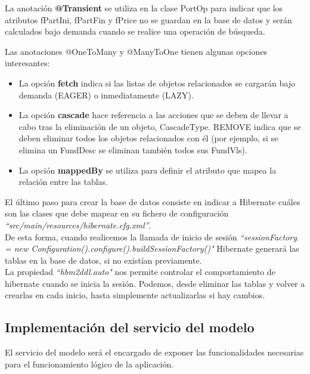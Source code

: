 \documentclass[12pt, a4paper]{book}
\begin{document}
La anotación \textbf{@Transient} se utiliza en la clase PortOp para indicar que los atributos fPartIni, fPartFin y fPrice no se guardan en la base de datos y serán calculados bajo demanda cuando se realice una operación de búsqueda.

\newpage
Las anotaciones @OneToMany y @ManyToOne tienen algunas opciones interesantes:
\begin{itemize}
	\item La opción \textbf{fetch} indica si las listas de objetos relacionados se cargarán bajo demanda (EAGER) o inmediatamente (LAZY).
	\item La opción \textbf{cascade} hace referencia a las acciones que se deben de llevar a cabo tras la eliminación de un objeto, CascadeType. REMOVE indica que se deben eliminar todos los objetos relacionados con él (por ejemplo, si se elimina un FundDesc se eliminan también todos sus FundVls).
	\item La opción \textbf{mappedBy} se utiliza para definir el atributo que mapea la relación entre las tablas.\\
\end{itemize}

 El último paso para crear la base de datos consiste en indicar a Hibernate cuáles son las clases que debe mapear en su fichero de configuración \textit{``src/main/resources/hibernate.cfg.xml''}.\\
 
  De esta forma, cuando realicemos la llamada de inicio de sesión \textit{``sessionFactory = new Configuration().configure().buildSessionFactory()"} Hibernate generará las tablas en la base de datos, si no existían previamente.\\
 
  La propiedad \textit{``hbm2ddl.auto"} nos permite controlar el comportamiento de hibernate cuando se inicia la sesión. Podemos, desde eliminar las tablas y volver a crearlas en cada inicio, hasta simplemente actualizarlas si hay cambios.

\newpage

\subsection{Implementación del servicio del modelo}

El servicio del modelo será el encargado de exponer las funcionalidades necesarias para el funcionamiento lógico de la aplicación.\\
\end{document}
